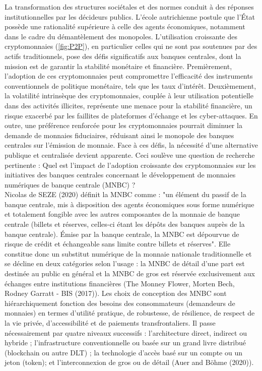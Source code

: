 \documentclass[12pt]{article}
\begin{document}
La transformation des structures sociétales et des normes conduit à des réponses institutionnelles par les décideurs publics. L'école autrichienne postule que l'État possède une rationalité supérieure à celle des agents économiques, notamment dans le cadre du démantèlement des monopoles. L'utilisation croissante des cryptomonnaies (\ref{fig:P2P}), en particulier celles qui ne sont pas soutenues par des actifs traditionnels, pose des défis significatifs aux banques centrales, dont la mission est de garantir la stabilité monétaire et financière. Premièrement, l'adoption de ces cryptomonnaies peut compromettre l'efficacité des instruments conventionnels de politique monétaire, tels que les taux d'intérêt. Deuxièmement, la volatilité intrinsèque des cryptomonnaies, couplée à leur utilisation potentielle dans des activités illicites, représente une menace pour la stabilité financière, un risque exacerbé par les faillites de plateformes d'échange et les cyber-attaques. En outre, une préférence renforcée pour les cryptomonnaies pourrait diminuer la demande de monnaies fiduciaires, réduisant ainsi le monopole des banques centrales sur l'émission de monnaie. Face à ces défis, la nécessité d'une alternative publique et centralisée devient apparente. Ceci soulève une question de recherche pertinente : Quel est l'impact de l'adoption croissante des cryptomonnaies sur les initiatives des banques centrales concernant le développement de monnaies numériques de banque centrale (MNBC) ?\\

Nicolas de SEZE (2020)\cite{de_seze_monnaies_2023} définit la MNBC comme : "un élément du passif de la banque centrale, mis à disposition des agents économiques sous forme numérique et totalement fongible avec les autres composantes de la monnaie de banque centrale (billets et réserves, celles-ci étant les dépôts des banques auprès de la banque centrale). Émise par la banque centrale, la MNBC est dépourvue de risque de crédit et échangeable sans limite contre billets et réserves". Elle constitue donc un substitut numérique de la monnaie nationale traditionnelle et se décline en deux catégories selon l'usage : la MNBC de détail d'une part est destinée au public en général et la MNBC de gros est réservée exclusivement aux échanges entre institutions financières (The Monney Flower, Morten Bech, Rodney Garratt  - BIS (2017)). Les choix de conception des MNBC sont hiérarchiquement fonction des besoins des consommateurs (demandeurs de monnaies) en termes d’utilité pratique, de robustesse, de résilience, de respect de la vie privée, d’accessibilité et de paiements transfrontaliers. Il passe nécessairement par quatre niveaux successifs : l’architecture direct, indirect ou hybride ;  l’infrastructure conventionnelle ou basée sur un grand livre distribué (blockchain ou autre DLT) ; la technologie d’accès basé sur un compte ou un jeton (token); et l’interconnexion de gros ou de détail (Auer and Böhme (2020)). \\
\end{document}
